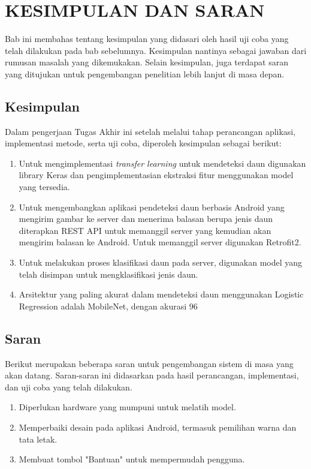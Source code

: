 \chapter{KESIMPULAN DAN SARAN}
Bab ini membahas tentang kesimpulan yang didasari oleh hasil uji coba yang telah dilakukan pada bab sebelumnya. Kesimpulan nantinya sebagai jawaban dari rumusan masalah yang dikemukakan. Selain kesimpulan, juga terdapat saran yang ditujukan untuk pengembangan penelitian lebih lanjut di masa depan.

\section{Kesimpulan}
Dalam pengerjaan Tugas Akhir ini setelah melalui tahap perancangan aplikasi, implementasi metode, serta uji coba, diperoleh kesimpulan sebagai berikut:

\begin{enumerate}
	\item Untuk mengimplementasi \textit{transfer learning} untuk mendeteksi daun digunakan library Keras dan pengimplementasian ekstraksi fitur menggunakan model yang tersedia.
	\item Untuk mengembangkan aplikasi pendeteksi daun berbasis Android yang mengirim gambar ke server dan menerima balasan berupa jenis daun diterapkan REST API untuk memanggil server yang kemudian akan mengirim balasan ke Android. Untuk memanggil server digunakan Retrofit2.
	\item Untuk melakukan proses klasifikasi daun pada server, digunakan model yang telah disimpan untuk mengklasifikasi jenis daun.
	\item Arsitektur yang paling akurat dalam mendeteksi daun menggunakan Logistic Regression adalah MobileNet, dengan akurasi 96%
\end{enumerate}

\section{Saran}
Berikut merupakan beberapa saran untuk pengembangan sistem di masa yang akan datang. Saran-saran ini didasarkan pada hasil perancangan, implementasi, dan uji coba yang telah dilakukan.
\begin{enumerate}
	\item Diperlukan hardware yang mumpuni untuk melatih model.
	\item Memperbaiki desain pada aplikasi Android, termasuk pemilihan warna dan tata letak.
	\item Membuat tombol "Bantuan" untuk mempermudah pengguna.
\end{enumerate}